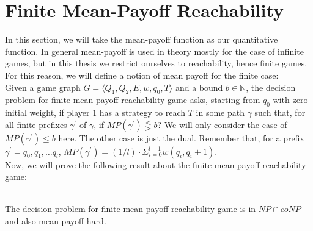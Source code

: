 \section{Finite Mean-Payoff Reachability}
In this section, we will take the mean-payoff function as our quantitative function. In general mean-payoff is used in theory mostly for the case of infinite games, but in this thesis we restrict ourselves to reachability, hence finite games. For this reason, we will define a notion of mean payoff for the finite case:\\
\vskip 0.5cm
Given a game graph $G=\langle Q_1, Q_2, E, w, q_0,T\rangle$ and a bound $b \in \mathbb{N}$, the decision problem for finite mean-payoff reachability game asks, starting from $q_0$ with zero initial weight, if player $1$ has a strategy to reach $T$ in some path $\gamma$ such that, for all finite prefixes $\gamma^{\prime}$ of $\gamma$, if $MP(\gamma^{\prime}) \lesseqgtr b$? We will only consider the case of  $MP(\gamma^{\prime}) \leq b$ here. The other case is just the dual. Remember that, for a prefix $\gamma^{\prime}= q_0,q_1,\ldots q_l$, $MP(\gamma^{\prime})= (1/l) \cdot \Sigma_{i=0}^{l-1} w(q_i,q_i+1)$.\\ Now, we will prove the following result about the finite mean-payoff reachability game:\\
\\
\begin{theorem}
\label{fin-meanpayoff-thm}
The decision problem for finite mean-payoff reachability game is in $NP \cap coNP$ and also mean-payoff hard. 
\end{theorem}
